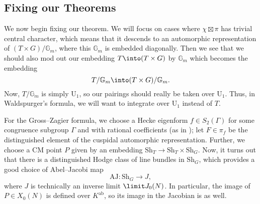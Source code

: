 \documentclass[../notes.tex]{subfiles}
\begin{document}
\subsection{Fixing our Theorems}
We now begin fixing our theorem. We will focus on cases where $\chi\boxtimes\pi$ has trivial central character, which means that it descends to an automorphic representation of $(T\times G)/\mathbb G_m$, where this $\mathbb G_m$ is embedded diagonally. Then we see that we should also mod out our embedding $T\into(T\times G)$ by $\mathbb G_m$ which becomes the embedding
\[T/\mathbb G_m\into(T\times G)/\mathbb G_m.\]
Now, $T/\mathbb G_m$ is simply $\mathrm U_1$, so our pairings should really be taken over $\mathrm U_1$. Thus, in Waldspurger's formula, we will want to integrate over $\mathrm U_1$ instead of $T$.

For the Gross--Zagier formula, we choose a Hecke eigenform $f\in S_2(\Gamma)$ for some congruence subgroup $\Gamma$ and with rational coefficients (as in ); let $F\in\pi_f$ be the distinguished element of the cuspidal automorphic representation. Further, we choose a CM point $P$ given by an embedding $\mathrm{Sh}_T\to\mathrm{Sh}_T\times\mathrm{Sh}_G$. Now, it turns out that there is a distinguished Hodge class of line bundles in $\mathrm{Sh}_G$, which provides a good choice of Abel--Jacobi map
\[\mathrm{AJ}\colon\mathrm{Sh}_G\to J,\]
where $J$ is technically an inverse limit $\limit J_0(N)$. In particular, the image of $P\in X_0(N)$ is defined over $K^{\mathrm{ab}}$, so its image in the Jacobian is as well.
\end{document}
